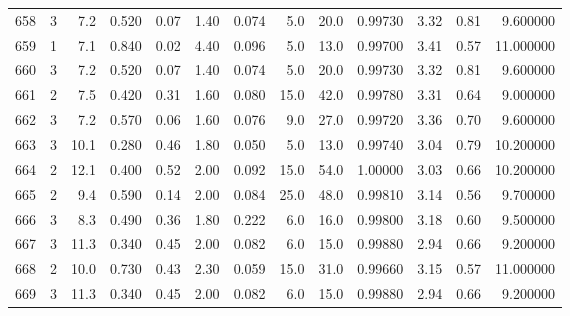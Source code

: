 \begin{tabular}{lrrrrrrrrrrrr}
658  &        3 &            7.2 &             0.520 &         0.07 &            1.40 &      0.074 &                  5.0 &                  20.0 &  0.99730 &  3.32 &       0.81 &   9.600000 \\
659  &        1 &            7.1 &             0.840 &         0.02 &            4.40 &      0.096 &                  5.0 &                  13.0 &  0.99700 &  3.41 &       0.57 &  11.000000 \\
660  &        3 &            7.2 &             0.520 &         0.07 &            1.40 &      0.074 &                  5.0 &                  20.0 &  0.99730 &  3.32 &       0.81 &   9.600000 \\
661  &        2 &            7.5 &             0.420 &         0.31 &            1.60 &      0.080 &                 15.0 &                  42.0 &  0.99780 &  3.31 &       0.64 &   9.000000 \\
662  &        3 &            7.2 &             0.570 &         0.06 &            1.60 &      0.076 &                  9.0 &                  27.0 &  0.99720 &  3.36 &       0.70 &   9.600000 \\
663  &        3 &           10.1 &             0.280 &         0.46 &            1.80 &      0.050 &                  5.0 &                  13.0 &  0.99740 &  3.04 &       0.79 &  10.200000 \\
664  &        2 &           12.1 &             0.400 &         0.52 &            2.00 &      0.092 &                 15.0 &                  54.0 &  1.00000 &  3.03 &       0.66 &  10.200000 \\
665  &        2 &            9.4 &             0.590 &         0.14 &            2.00 &      0.084 &                 25.0 &                  48.0 &  0.99810 &  3.14 &       0.56 &   9.700000 \\
666  &        3 &            8.3 &             0.490 &         0.36 &            1.80 &      0.222 &                  6.0 &                  16.0 &  0.99800 &  3.18 &       0.60 &   9.500000 \\
667  &        3 &           11.3 &             0.340 &         0.45 &            2.00 &      0.082 &                  6.0 &                  15.0 &  0.99880 &  2.94 &       0.66 &   9.200000 \\
668  &        2 &           10.0 &             0.730 &         0.43 &            2.30 &      0.059 &                 15.0 &                  31.0 &  0.99660 &  3.15 &       0.57 &  11.000000 \\
669  &        3 &           11.3 &             0.340 &         0.45 &            2.00 &      0.082 &                  6.0 &                  15.0 &  0.99880 &  2.94 &       0.66 &   9.200000 \\

\end{tabular}

